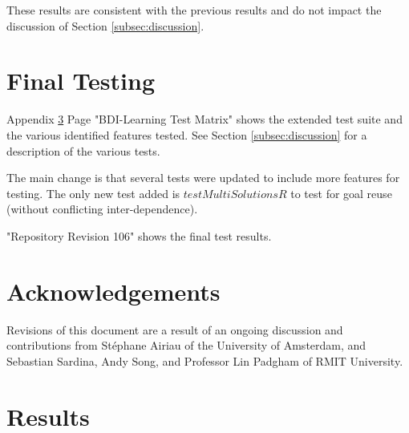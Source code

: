 \documentclass[a4paper]{article}
\newcommand{\stephane}{{St\'ephane}\xspace}
\begin{document}
These results are consistent with the previous results and do not impact the discussion of Section \ref{subsec:discussion}.

\section{Final Testing}

Appendix \ref{sec:results} Page "BDI-Learning Test Matrix" shows the extended test suite and the various identified features tested. See Section \ref{subsec:discussion} for a description of the various tests. 

The main change is that several tests were updated to include more features for testing. The only new test added is $testMultiSolutionsR$ to test for goal reuse (without conflicting inter-dependence). 

"Repository Revision 106" shows the final test results.

\section{Acknowledgements}

Revisions of this document are a result of an ongoing discussion and contributions from \stephane Airiau of the University of Amsterdam, and Sebastian Sardina, Andy Song, and Professor Lin Padgham of RMIT University.


 


\appendix

\section{Results}
\label{sec:results}










\end{document}
